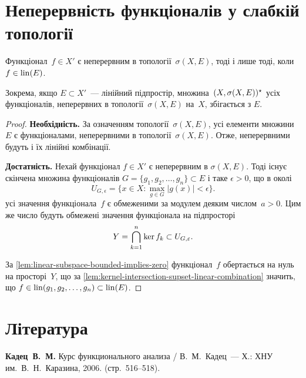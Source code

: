 \section{Неперервність функціоналів у слабкій топології}

\begin{theorem}
    Функціонал~$f \in X'$ є неперервним в топології~$\sigma(X, E)$, тоді і лише тоді, коли $f \in \operatorname{lin}(E)$.
\end{theorem}

\begin{remark}
    Зокрема, якщо $E \subset X'$~--- лінійний підпростір, множина~$(X, \sigma(X, E))^\star$ усіх функціоналів, неперервних в топології~$\sigma(X, E)$ на~$X$, збігається з $E$.
\end{remark}

\begin{proof}
    \textbf{Необхідність.} За означенням топології~$\sigma(X, E)$, усі елементи множини~$E$ є функціоналами, неперервними в топології~$\sigma(X, E)$. Отже, неперервними будуть і їх лінійні комбінації.

    \textbf{Достатність.} Нехай функціонал $f \in X'$ є неперервним в $\sigma(X, E)$. Тоді існує скінчена множина функціоналів $G = \{g_1, g_2, \dots, g_n\} \subset E$ і таке $\epsilon > 0$, що в околі
    \begin{equation*}
        U_{G, \epsilon} = \{x \in X: \max_{g \in G} |g(x)| < \epsilon\}.
    \end{equation*}
    усі значення функціонала~$f$ є обмеженими за модулем деяким числом~$a > 0$. Цим же число будуть обмежені значення функціонала на підпросторі
    \begin{equation*}
        Y = \bigcap_{k = 1}^n \operatorname{ker} f_k \subset U_{G, \varepsilon}.
    \end{equation*}

    За \cref{lem:linear-subspace-bounded-implies-zero} функціонал~$f$ обертається на нуль на просторі~$Y$, що за \cref{lem:kernel-intersection-supset-linear-combination} значить, що $f \in \operatorname{lin}(g_1, g_2, \dots, g_n) \subset \operatorname{lin}(E)$.
\end{proof}

\section{Література}

\begin{enumerate}[label={[\arabic*]}]
\item \textbf{Кадец~В.~М.}
Курс функционального анализа /
В.~М.~Кадец~---
Х.: ХНУ им.~В.~Н.~Каразина, 2006. (стр.~516--518).
\end{enumerate}
